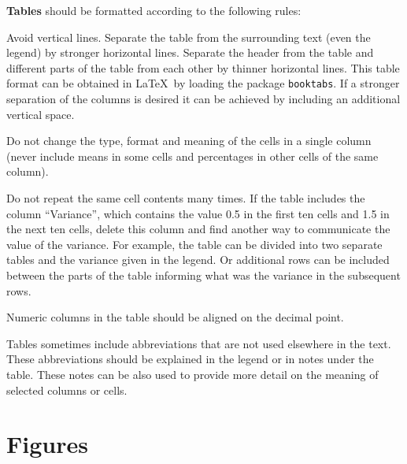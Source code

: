 \textbf{Tables} should be formatted according to the following rules:
\begin{compactitem} %
\item Avoid vertical lines. Separate the table from the surrounding
  text (even the legend) by stronger horizontal lines. Separate the
  header from the table and different parts of the table from each
  other by thinner horizontal lines. This table format can be obtained
  in \LaTeX\ by loading the package \texttt{booktabs}. If a stronger
  separation of the columns is desired it can be achieved by including
  an additional vertical space. 
\item Do not change the type, format and meaning of the cells in a
  single column (never include means in some cells and percentages in
  other cells of the same column).
\item Do not repeat the same cell contents many times. If the table
  includes the column ``Variance'', which contains the value 0.5 in
  the first ten cells and 1.5 in the next ten cells, delete this
  column and find another way to communicate the value of the
  variance. For example, the table can be divided into two separate
  tables and the variance given in the legend. Or additional rows can
  be included between the parts of the table informing what was the
  variance in the subsequent rows.
\item Numeric columns in the table should be aligned on the decimal
  point. 
\item Tables sometimes include abbreviations that are not used
  elsewhere in the text. These abbreviations should be explained in
  the legend or in notes under the table. These notes can be also used
  to provide more detail on the meaning of selected columns or cells. 
\end{compactitem}




\section{Figures}

